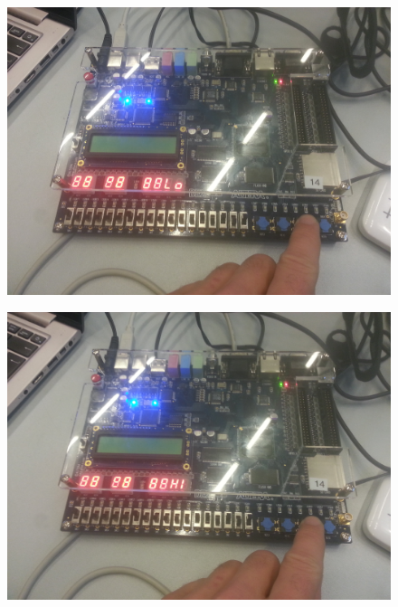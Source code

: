 \begin{enumerate}
\begin{figure}[h]
		\includegraphics[scale=0.8]{pictures/Oevelse5/opg3/guess_try_lo.JPG}
		\caption{}
		\label{fig:GuessTryLo}
	\end{figure}
	\begin{figure}[h]
		\centering
		\includegraphics[scale=0.8]{pictures/Oevelse5/opg3/guess_try_hi.JPG}
		\caption{}
		\label{fig:GuessTryHi}
	\end{figure}
	\begin{figure}[h]
		\centering

\end{figure}
\end{enumerate}
